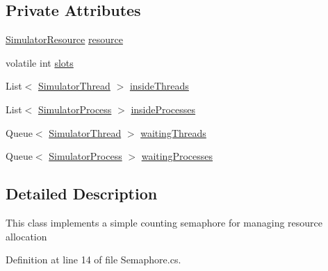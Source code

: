 \subsection*{Private Attributes}
\begin{DoxyCompactItemize}
\item 
\hyperlink{class_c_p_u___o_s___simulator_1_1_operating___system_1_1_simulator_resource}{Simulator\+Resource} \hyperlink{class_c_p_u___o_s___simulator_1_1_operating___system_1_1_threading_1_1_semaphore_a9e455411df1e6ee61e1479f63767771c}{resource}
\item 
volatile int \hyperlink{class_c_p_u___o_s___simulator_1_1_operating___system_1_1_threading_1_1_semaphore_af038c196aad3640c1342b6cd5e67c758}{slots}
\item 
List$<$ \hyperlink{class_c_p_u___o_s___simulator_1_1_operating___system_1_1_threading_1_1_simulator_thread}{Simulator\+Thread} $>$ \hyperlink{class_c_p_u___o_s___simulator_1_1_operating___system_1_1_threading_1_1_semaphore_ae3abcf563abc5ec4c98b4df6a57a25fc}{inside\+Threads}
\item 
List$<$ \hyperlink{class_c_p_u___o_s___simulator_1_1_operating___system_1_1_simulator_process}{Simulator\+Process} $>$ \hyperlink{class_c_p_u___o_s___simulator_1_1_operating___system_1_1_threading_1_1_semaphore_a3d77008b1c601d57f7b18e8e1921e457}{inside\+Processes}
\item 
Queue$<$ \hyperlink{class_c_p_u___o_s___simulator_1_1_operating___system_1_1_threading_1_1_simulator_thread}{Simulator\+Thread} $>$ \hyperlink{class_c_p_u___o_s___simulator_1_1_operating___system_1_1_threading_1_1_semaphore_aedb8f404f0caf1c69f6f56153c39635a}{waiting\+Threads}
\item 
Queue$<$ \hyperlink{class_c_p_u___o_s___simulator_1_1_operating___system_1_1_simulator_process}{Simulator\+Process} $>$ \hyperlink{class_c_p_u___o_s___simulator_1_1_operating___system_1_1_threading_1_1_semaphore_a6adac6dc7832c6b8b1aef64971595b10}{waiting\+Processes}
\end{DoxyCompactItemize}


\subsection{Detailed Description}
This class implements a simple counting semaphore for managing resource allocation 



Definition at line 14 of file Semaphore.\+cs.



